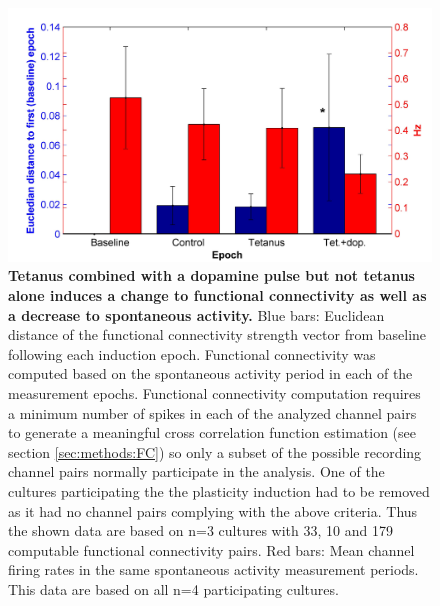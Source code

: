         \begin{figure}[!htb]
            \centering
            \includegraphics[width=15cm]{chapter3/figures/FCChangeStats/FCStats.jpg}

            \caption[Statistics of Change to functional connectivity and average unit firing rate in the combined dopamine and tetanus plasticity induction experiment]{\textbf{Tetanus combined with a dopamine pulse but not tetanus alone induces a change to functional connectivity as well as a decrease to spontaneous activity.} Blue bars: Euclidean distance of the functional connectivity strength vector from baseline following each induction epoch. Functional connectivity was computed based on the spontaneous activity period in each of the measurement epochs. Functional connectivity computation requires a minimum number of spikes in each of the analyzed channel pairs to generate a meaningful cross correlation function estimation (see section \ref{sec:methods:FC}) so only a subset of the possible recording channel pairs normally participate in the analysis. One of the cultures participating the the plasticity induction had to be removed as it had no channel pairs complying with the above criteria. Thus the shown data are based on n=3 cultures with 33, 10 and 179 computable functional connectivity pairs. Red bars: Mean channel firing rates in the same spontaneous activity measurement periods. This data are based on all n=4 participating cultures.}
            \label{fig:activity:tetFCChange}
        \end{figure}

